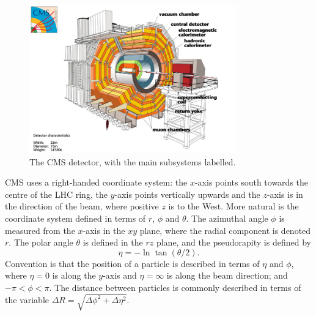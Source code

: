 \begin{figure}[htbp]
  \begin{center}
  \includegraphics[width=0.8\textwidth]{Figures/detector/CMSlabelled}
  \caption{The \ac{CMS} detector, with the main subsystems labelled.
}
  \label{fig:CMS}
  \end{center}
\end{figure}

\ac{CMS} uses a right-handed coordinate system: the $x$-axis points south towards the centre of the \ac{LHC} ring, the $y$-axis points vertically upwards and the $z$-axis is in the direction of the beam, where positive $z$ is to the West.
More natural is the coordinate system defined in terms of $r$, $\phi$ and $\theta$.
The azimuthal angle $\phi$ is measured from the $x$-axis in the $xy$ plane, where the radial component is denoted $r$. The polar angle $\theta$ is defined in the $rz$ plane, and the pseudorapity is defined by
\begin{equation}
\eta = - \ln \tan (\theta /2).
\end{equation}
Convention is that the position of a particle is described in terms of $\eta$ and $\phi$, where $\eta = 0$ is along the $y$-axis and $\eta = \infty $ is along the beam direction; and $-\pi < \phi < \pi$. The distance between particles is commonly described in terms of the variable $\Delta R = \sqrt{\Delta\phi^2+\Delta\eta^2}$.

